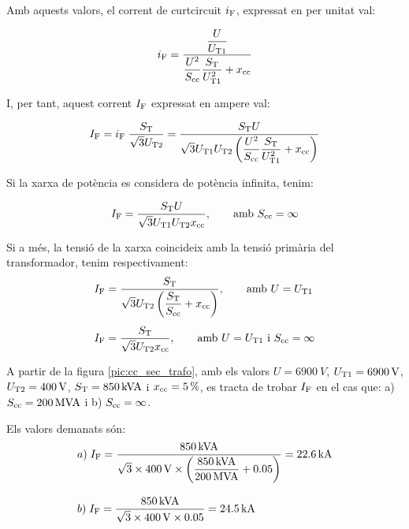 Amb aquests valors, el corrent de curtcircuit $i_\mathrm{F}$, expressat
en per unitat val:

\begin{equation}
    i_\mathrm{F} = \frac{\dfrac{U}{U_\mathrm{T1}}}{\dfrac{U^2}{S_\mathrm{cc}}
    \dfrac{S_\mathrm{T}}{U_\mathrm{T1}^2} + x_\mathrm{cc}}
\end{equation}

I, per tant, aquest corrent $I_\mathrm{F}$ expressat en ampere val:

\begin{equation}
    I_\mathrm{F} = i_\mathrm{F}\; \frac{S_\mathrm{T}}{\sqrt{3}U_\mathrm{T2}} =
    \frac{S_\mathrm{T} U}{\sqrt{3} U_\mathrm{T1}U_\mathrm{T2}
    \left(\dfrac{U^2}{S_\mathrm{cc}}
    \dfrac{S_\mathrm{T}}{U_\mathrm{T1}^2} + x_\mathrm{cc}\right)}
\end{equation}

Si la xarxa de potència es considera de potència infinita, tenim:

\begin{equation}
    I_\mathrm{F} = \frac{S_\mathrm{T} U}{\sqrt{3} U_\mathrm{T1}U_\mathrm{T2}
    x_\mathrm{cc}},\qquad \text{amb }S_\mathrm{cc}=\infty
\end{equation}

Si a més, la tensió de la xarxa coincideix amb la tensió primària
del transformador, tenim respectivament:
\begin{align}
    I_\mathrm{F} &= \frac{S_\mathrm{T}}{\sqrt{3} U_\mathrm{T2}
    \left(\dfrac{S_\mathrm{T}}{S_\mathrm{cc}} +
    x_\mathrm{cc}\right)},\qquad \text{amb }U=U_\mathrm{T1}\\[1ex]
    I_\mathrm{F} &= \frac{S_\mathrm{T}}{\sqrt{3} U_\mathrm{T2}
    x_\mathrm{cc}}, \qquad \text{amb }U=U_\mathrm{T1}\text{ i }
    S_\mathrm{cc}=\infty
\end{align}


\begin{exemple}[\CorrentCcSecTrafo{}]
	\addcontentsxms{\CorrentCcSecTrafo}
    A partir de la figura \vref{pic:cc_sec_trafo}, amb els valors
    $U=\qty{6900}{V}$, $U_\mathrm{T1}=\qty{6900}{V}$,
    $U_\mathrm{T2}=\qty{400}{V}$, $S_\mathrm{T}=\qty{850}{kVA}$ i
    $x_\mathrm{cc}=\qty{5}{\percent}$, es tracta de trobar $I_\mathrm{F}$ en el cas
    que: a) $S_\mathrm{cc}=\qty{200}{MVA}$ i b) $S_\mathrm{cc}=\infty$.

    Els valors demanats són:
    \begin{align*}
       &a)\;I_\mathrm{F} = \frac{\qty{850}{kVA}}{\sqrt{3}\times \qty{400}{V}\times
       \left(\dfrac{\qty{850}{kVA}}{\qty{200}{MVA}} +
       \num{0,05}\right)} = \qty{22,6}{kA} \\[2ex]
       &b)\;I_\mathrm{F} = \frac{\qty{850}{kVA}}{\sqrt{3}\times \qty{400}{V}\times
       \num{0,05}} = \qty{24,5}{kA}
    \end{align*}

\end{exemple}



